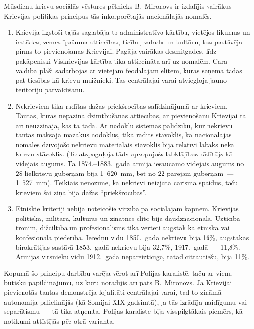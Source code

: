 \documentclass[twoside,a5paper,12pt,fleqn,openany]{extbook}
\begin{document}
Mūsdienu krievu sociālās vēstures pētnieks B.~Mironovs ir izdalījis vairākus Krievijas politikas principus tās inkorporētajās nacionālajās nomalēs.

\begin{enumerate}
\item Krievija ilgstoši tajās saglabāja to administratīvo kārtību, vietējos likumus un iestādes, zemes īpašuma attiecības, ticību, valodu un kultūru, kas pastāvēja pirms to pievienošanas Krievijai. Pagāja vairākas desmitgades, līdz pakāpeniski Viskrievijas kārtība tika attiecināta arī uz nomalēm. Cara valdība plaši sadarbojās ar vietējām feodālajām elitēm, kuras saņēma tādas pat tiesības kā krievu muižnieki. Tas centrālajai varai atviegloja jauno teritoriju pārvaldīšanu.

\item Nekrieviem tika radītas dažas priekšrocības salīdzinājumā ar krieviem. Tautas, kuras nepazina dzimtbūšanas attiecības, ar pievienošanu Krievijai tā arī neuzzināja, kas tā tāda. Ar nodokļu sistēmas palīdzību, kur nekrievu tautas maksāja mazākus nodokļus, tika radīts stāvoklis, ka nacionālajās nomalēs dzīvojošo nekrievu materiālais stāvoklis bija relatīvi labāks nekā krievu stāvoklis. (To atspoguļoja tāds apkopojošs labklājības rādītājs kā vidējais augums. Tā 1874.--1883.~gadā armijā iesaucamo vidējais augums no 28 lielkrievu guberņām bija 1~620~mm, bet no 22 pārējām guberņām~--- 1~627~mm). Teiktais nenozīmē, ka nekrievi neizjuta carisma spaidus, taču krieviem šai ziņā bija dažas ``priekšrocības''.

\item Etniskie kritēriji nebija noteicošie virzībā pa sociālajām kāpnēm. Krievijas politiskā, militārā, kultūras un zinātnes elite bija daudznacionāla. Uzticība tronim, dižciltība un profesionālisms tika vērtēti augstāk kā etniskā vai konfesionālā piederība. Ierēdņu vidū 1850.~gadā nekrievu bija 16\%, augstākās birokrātijas sastāvā 1853.~gadā nekrievu bija 32,7\%, 1917.~gadā~--- 11,8\%. Armijas virsnieku vidū 1912.~gadā nepareizticīgo, tātad cittautiešu, bija 11\%.
\end{enumerate}

Kopumā šo principu darbību varēja vērot arī Polijas karalistē, taču ar vienu būtisku papildinājumu, uz kuru norādījis arī pats B.~Mironovs. Ja Krievijai pievienotās tautas demonstrēja lojalitāti centrālajai varai, tad to zināmā autonomija palielinājās (kā Somijai XIX gadsimtā), ja tās izrādīja naidīgumu vai separātismu~--- tā tika atņemta. Polijas karaliste bija visspilgtākais piemērs, kā notikumi attīstījās pēc otrā varianta.
\end{document}
